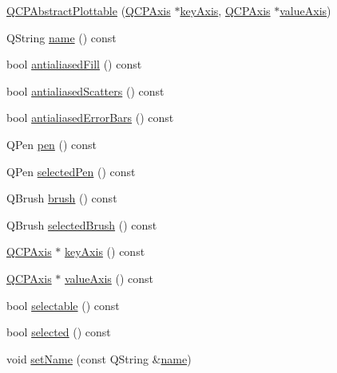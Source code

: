 \begin{DoxyCompactItemize}
\item 
\hyperlink{classQCPAbstractPlottable_af78a036e40db6f53a31abadc5323715a}{Q\+C\+P\+Abstract\+Plottable} (\hyperlink{classQCPAxis}{Q\+C\+P\+Axis} $\ast$\hyperlink{classQCPAbstractPlottable_a72c7a09c22963f2c943f07112b311103}{key\+Axis}, \hyperlink{classQCPAxis}{Q\+C\+P\+Axis} $\ast$\hyperlink{classQCPAbstractPlottable_a3106f9d34d330a6097a8ec5905e5b519}{value\+Axis})
\item 
Q\+String \hyperlink{classQCPAbstractPlottable_a1affc1972938e4364a9325e4e4e4dcea}{name} () const 
\item 
bool \hyperlink{classQCPAbstractPlottable_a68d1c358db03faae376ec47c589abf27}{antialiased\+Fill} () const 
\item 
bool \hyperlink{classQCPAbstractPlottable_aefc379bcc011660a5371ecc6088a97eb}{antialiased\+Scatters} () const 
\item 
bool \hyperlink{classQCPAbstractPlottable_a630cfb27ff99ab4373b09631748fcf4a}{antialiased\+Error\+Bars} () const 
\item 
Q\+Pen \hyperlink{classQCPAbstractPlottable_a41d060007cc6b3037c9c04d22d0c0398}{pen} () const 
\item 
Q\+Pen \hyperlink{classQCPAbstractPlottable_a006065572c5add883a944ea4cda699f3}{selected\+Pen} () const 
\item 
Q\+Brush \hyperlink{classQCPAbstractPlottable_aa74cdceb9c7286ef116fbfa58e0326e7}{brush} () const 
\item 
Q\+Brush \hyperlink{classQCPAbstractPlottable_a403745791879916431adc872b49207e5}{selected\+Brush} () const 
\item 
\hyperlink{classQCPAxis}{Q\+C\+P\+Axis} $\ast$ \hyperlink{classQCPAbstractPlottable_a72c7a09c22963f2c943f07112b311103}{key\+Axis} () const 
\item 
\hyperlink{classQCPAxis}{Q\+C\+P\+Axis} $\ast$ \hyperlink{classQCPAbstractPlottable_a3106f9d34d330a6097a8ec5905e5b519}{value\+Axis} () const 
\item 
bool \hyperlink{classQCPAbstractPlottable_af895574da1ec0d050711b6c9deda296a}{selectable} () const 
\item 
bool \hyperlink{classQCPAbstractPlottable_ab901903adcb0e29467d63de72340ab29}{selected} () const 
\item 
void \hyperlink{classQCPAbstractPlottable_ab79c7ba76bc7fa89a4b3580e12149f1f}{set\+Name} (const Q\+String \&\hyperlink{classQCPAbstractPlottable_a1affc1972938e4364a9325e4e4e4dcea}{name})
\item 

\end{DoxyCompactItemize}
